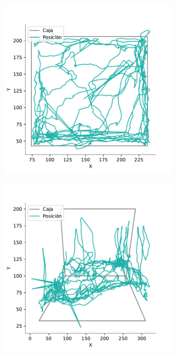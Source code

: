 \begin{figure}[H]
  \centering
  \begin{subfigure}{0.45\textwidth}
    \centering
    \includegraphics[width=\textwidth]{figures/raw-trayectory-top-4128-2020-12-02.pdf}
    \caption{}
  \end{subfigure}
  \begin{subfigure}{0.45\textwidth}
    \centering
    \includegraphics[width=\textwidth]{figures/raw-trayectory-lateral-4128-2020-12-02.pdf}

\end{subfigure}
\end{figure}
